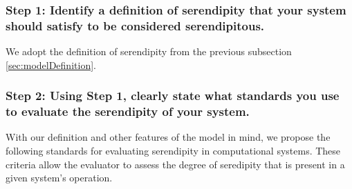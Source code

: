 




\subsubsection*{Step 1: Identify a definition of serendipity that your system should satisfy to be considered serendipitous.}

\noindent We adopt the definition of serendipity from the previous subsection
\ref{sec:modelDefinition}.

\subsubsection*{Step 2: Using Step 1, clearly state what standards you use to evaluate the serendipity of your system.}

\noindent With our definition and other features of the model in mind, we propose the following standards for evaluating serendipity in computational systems. These criteria allow the evaluator to assess the degree of seredipity that is present in a given system's operation.


